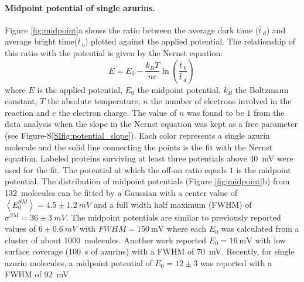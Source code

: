 \documentclass[journal=jacsat,manuscript=article]{achemso}
\newcommand*\me[1]{\ensuremath{\bar{#1}\,}}
\begin{document}
\paragraph*{Midpoint potential of single azurins.}
Figure \ref{fig:midpoint}a shows the ratio between the average dark time ($\me{t}_{d}$) and average bright time($\me{t}_{b}$) plotted against the applied potential.
The relationship of this ratio with the potential is given by the Nernst equation: 
\begin{equation}
	E = E_0 - \frac{k_BT}{n e}\ln\left(\frac{\me{t}_{b}}{\me{t}_{d}}\right)\,
	\label{eq:nernst}
\end{equation}
where $E$ is the applied potential, $E_0$ the midpoint potential, $k_B$ the Boltzmann constant, $T$ the absolute temperature, $n$ the number of electrons involved in the reaction and $e$ the electron charge.
The value of $n$ was found to be $1$ from the data analysis when the slope in the Nernst equation was kept as a free parameter (see Figure-S\ref{SIfig:potential_slope}).
Each color represents a single azurin molecule and the solid line connecting the points is the fit with the Nernst equation.
Labeled proteins surviving at least three potentials above \SI{40}{\mV} were used for the fit.
The potential at which the off-on ratio equals $1$ is the midpoint potential.
The distribution of midpoint potentials (Figure \ref{fig:midpoint}b) from \SI{132}{ molecules} can be fitted by a Gaussian with a center value of $\left<E_0^{SM}\right>=4.5 \pm 1.2~mV$ and a full width half maximum (FWHM) of $\sigma^{SM}=36 \pm 3~mV$. 
The midpoint potentials are similar to previously reported values of $6\pm0.6~mV$ with $FWHM=\SI{150}{\mV}$ where each $E_0$ was calculated from a cluster of about \SI{1000}{ molecules}.\cite{davis2006monitoring}
Another work reported $E_0 = \SI{16}{\mV}$ with low surface coverage (\SI{100}{\s} of azurins) with a FWHM of \SI{70}{\mV}.\cite{salverda2010fluorescent} 
Recently, for single azurin molecules, a midpoint potential of $E_0=12\pm3$ was reported with a FWHM of \SI{92}{\mV}.\cite{akkilic2014chemically-induced}\\
\end{document}
